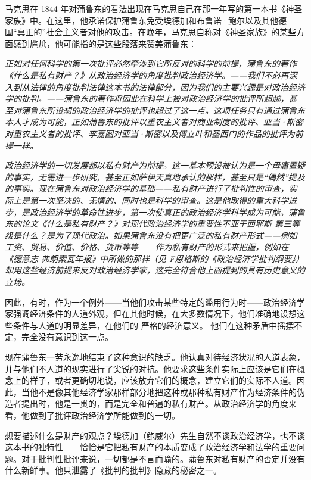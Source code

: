 \documentclass[DIV=12,%
               BCOR=0mm,%
               headinclude=false,%
               footinclude=false,open=any,%
               fontsize=10pt,%
               oneside,%
               paper=210mm:11in]%
               {scrbook}
\begin{document}
马克思在 1844 年对蒲鲁东的看法出现在马克思自己在那一年写的第一本书《神圣家族》中。在这里，他承诺保护蒲鲁东免受埃德加和布鲁诺·鲍尔以及其他德国“真正的”社会主义者对他的攻击。在晚年，马克思自称对《神圣家族》的某些方面感到尴尬，他可能指的是这些段落来赞美蒲鲁东：


\emph{正如对任何科学的第一次批评必然牵涉到它所反对的科学的前提，蒲鲁东的著作《什么是私有财产？》从政治经济学的角度批判政治经济学。——我们不必再深入到从法律的角度批判法律这本书的法律部分，因为我们的主要兴趣是对政治经济学的批判。——蒲鲁东的著作将因此在科学上被对政治经济学的批评所超越，甚至对蒲鲁东所设想的政治经济学的批评也超过了这一点。这项任务只有通过蒲鲁东本人才成为可能，正如蒲鲁东的批评以重农主义者对商业制度的批评、亚当·斯密对重农主义者的批评、李嘉图对亚当·斯密以及傅立叶和圣西门的作品的批评为前提一样。}


\emph{政治经济学的一切发展都以私有财产为前提。这一基本预设被认为是一个毋庸置疑的事实，无需进一步研究，甚至正如萨伊天真地承认的那样，甚至只是“偶然”提及的事实。现在蒲鲁东对政治经济学的基础——私有财产进行了批判性的审查，实际上是第一次坚决的、无情的、同时也是科学的审查。这是他取得的重大科学进步，是政治经济学的革命性进步，第一次使真正的政治经济学科学成为可能。蒲鲁东的论文《什么是私有财产？》对现代政治经济学的重要性不亚于西耶斯 第三等级是什么？是为了现代政治。如果蒲鲁东没有把更广泛的私有财产形式——例如工资、贸易、价值、价格、货币等等——作为私有财产的形式来把握，例如在《德意志-弗朗索瓦年报》中所做的那样（见 F恩格斯的《政治经济学批判纲要》）却用这些经济前提来反对政治经济学家，这完全符合他上面提到的具有历史意义的立场。}


因此，有时，作为一个例外——当他们攻击某些特定的滥用行为时——政治经济学家强调经济条件的人道外观，但在其他时候，在大多数情况下，他们准确地设想这些条件与人道的明显差异，在他们的 严格的经济意义。 他们在这种矛盾中摇摆不定，完全没有意识到这一点。


现在蒲鲁东一劳永逸地结束了这种意识的缺乏。他认真对待经济状况的人道表象，并与他们不人道的现实进行了尖锐的对抗。他要求这些条件实际上应该是它们在概念上的样子，或者更确切地说，应该放弃它们的概念，建立它们的实际不人道。因此，当他不是像其他经济学家那样部分地把这种或那种私有财产作为经济条件的伪造者提出时，他是一贯的，而是完全和普遍的私有财产。从政治经济学的角度来看，他做到了批评政治经济学所能做到的一切。


想要描述什么是财产的观点？埃德加（鲍威尔）先生自然不谈政治经济学，也不谈这本书的独特性——恰恰是它把私有财产的本质变成了政治经济学和法学的重要问题。对于批判性批评来说，一切都是不言而喻的。蒲鲁东对私有财产的否定并没有什么新鲜事。他只泄露了《批判的批判》隐藏的秘密之一。
\end{document}
